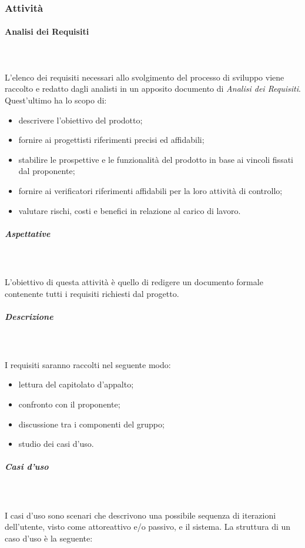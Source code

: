 		\subsubsection{Attività}
			\paragraph{Analisi dei Requisiti} \mbox{} \\ \mbox{} \\
			L'elenco dei requisiti necessari allo svolgimento del processo di sviluppo viene raccolto e redatto dagli analisti in un apposito documento di \textit{Analisi dei Requisiti}. Quest'ultimo ha lo scopo di:
				\begin{itemize}
					\item descrivere l'obiettivo del prodotto;
					\item fornire ai progettisti riferimenti precisi ed affidabili;
					\item stabilire le prospettive e le funzionalità del prodotto in base ai vincoli fissati dal proponente;
					\item fornire ai verificatori riferimenti affidabili per la loro attività di controllo;
					\item valutare rischi, costi e benefici in relazione al carico di lavoro.
				\end{itemize} 
			\subparagraph*{Aspettative} \mbox{} \\ \mbox{} \\
			L'obiettivo di questa attività è quello di redigere un documento formale contenente tutti i requisiti richiesti dal progetto.
			\subparagraph*{Descrizione} \mbox{} \\ \mbox{} \\
			I requisiti saranno raccolti nel seguente modo:
				\begin{itemize} 
					\item lettura del capitolato d'appalto;
					\item confronto con il proponente;
					\item discussione tra i componenti del gruppo;
					\item studio dei casi d'uso.
				\end{itemize}
				\subparagraph*{Casi d'uso} \mbox{} \\ \mbox{} \\
				I casi d'uso sono scenari che descrivono una possibile sequenza di iterazioni dell'utente, visto come attore\glo attivo e/o passivo, e il sistema. La struttura di un caso d'uso è la seguente:
